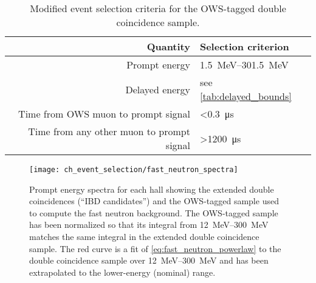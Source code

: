 \begin{table}
    \centering
    \caption[OWS tag criteria]{
        Modified event selection criteria for the OWS-tagged
        double coincidence sample.
    }
    \label{tab:fast_neutron}
    \begin{tabular}[t]{rl}
        \toprule
        Quantity & Selection criterion \\
        \midrule
        Prompt energy & \SIrange{1.5}{301.5}{\MeV} \\
        Delayed energy & see \cref{tab:delayed_bounds} \\
        Time from OWS muon to prompt signal & \SI{<0.3}{\us} \\
        Time from any other muon to prompt signal & \SI{>1200}{\us} \\
        \bottomrule
    \end{tabular}
\end{table}

\begin{figure}
    \centering
    \texttt{[image: ch\_event\_selection/fast\_neutron\_spectra]}
    \caption[Fast neutron spectrum]{
        Prompt energy spectra for each hall
        showing the extended double coincidences (``IBD candidates'')
        and the OWS-tagged sample used to compute the fast neutron background.
        The OWS-tagged sample has been normalized
        so that its integral from \SIrange{12}{300}{\MeV}
        matches the same integral in the extended double coincidence sample.
        The red curve is a fit of \cref{eq:fast_neutron_powerlaw}
        to the double coincidence sample over \SIrange{12}{300}{\MeV}
        and has been extrapolated to the lower-energy (nominal) range.
    }
    \label{fig:fast_neutron}
\end{figure}

